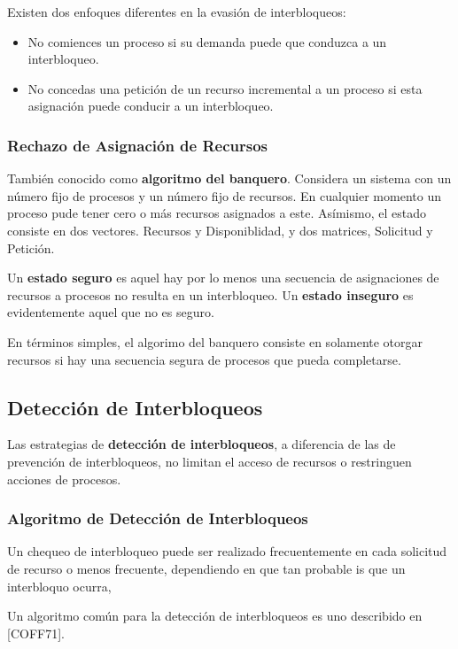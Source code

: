 \documentclass[12pt, a4paper]{article} %
\begin{document}
Existen dos enfoques diferentes en la evasión de interbloqueos:

\begin{itemize}
	\item No comiences un proceso si su demanda puede que conduzca a un interbloqueo.
	\item No concedas una petición de un recurso incremental a un proceso si esta asignación puede conducir a un interbloqueo.
\end{itemize}

\subsubsection{Rechazo de Asignación de Recursos}

También conocido como \textbf{algoritmo del banquero}. Considera un sistema con un número fijo de procesos y un número fijo de recursos. En cualquier momento un proceso pude tener cero o más recursos asignados a este. Asímismo, el estado consiste en dos vectores. Recursos y Disponiblidad, y dos matrices, Solicitud y Petición. 

Un \textbf{estado seguro} es aquel hay por lo menos una secuencia de asignaciones de recursos a procesos no resulta en un interbloqueo. Un \textbf{estado inseguro} es evidentemente aquel que no es seguro.

En términos simples, el algorimo del banquero consiste en solamente otorgar recursos si hay una secuencia segura de procesos que pueda completarse.

\subsection{Detección de Interbloqueos}

Las estrategias de \textbf{detección de interbloqueos}, a diferencia de las de prevención de interbloqueos, no limitan el acceso de recursos o restringuen acciones de procesos.

\subsubsection{Algoritmo de Detección de Interbloqueos}

Un chequeo de interbloqueo puede ser realizado frecuentemente en cada solicitud de recurso o menos frecuente, dependiendo en que tan probable is que un interbloquo ocurra,

Un algoritmo común para la detección de interbloqueos es uno describido en [COFF71].
\end{document}
